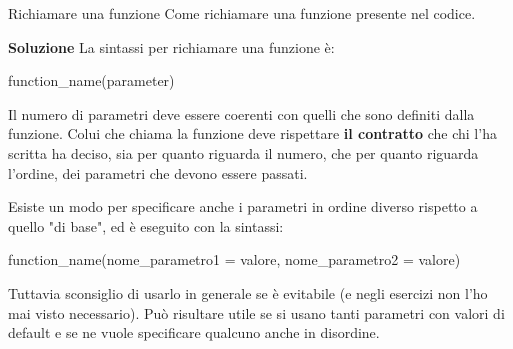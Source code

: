 \documentclass[10pt]{article}
\makeatletter
\newcommand{\<}{\langle}
\renewcommand{\>}{\rangle}
\renewenvironment{proof}[1][\proofname] {\par\pushQED{\qed}
\renewcommand*{\proofname}{Soluzione}
{\normalfont\sffamily\bfseries\topsep6\p@\@plus6\p@\relax #1\@addpunct{.} }}{\popQED\endtrivlist\@endpefalse}
\theoremstyle{mystyle}{\newtheorem*{remark}{Nota}}
\theoremstyle{mystyle}{\newtheorem*{remarks}{Note}}
\theoremstyle{mystyle}{\newtheorem*{example}{Esempio}}
\theoremstyle{mystyle}{\newtheorem*{examples}{Esempi}}
\theoremstyle{definition}{\newtheorem*{exercise}{Exercise}}
\theoremstyle{warn}
\makeatother
\begin{document}
\begin{definition}{Richiamare una funzione}{}
Come richiamare una funzione presente nel codice.
\end{definition}
\begin{proof}
La sintassi per richiamare una funzione è:
\begin{python}
function_name(parameter)
\end{python}
Il numero di parametri deve essere coerenti con quelli che sono definiti dalla funzione. Colui che chiama la funzione deve rispettare \textbf{il contratto} che chi l'ha scritta ha deciso, sia per quanto riguarda il numero, che per quanto riguarda l'ordine, dei parametri che devono essere passati.
\end{proof}
\begin{remark}
Esiste un modo per specificare anche i parametri in ordine diverso rispetto a quello "di base", ed è eseguito con la sintassi:
\begin{python}
function_name(nome_parametro1 = valore, nome_parametro2 = valore)
\end{python}
Tuttavia sconsiglio di usarlo in generale se è evitabile (e negli esercizi     non l'ho mai visto necessario). Può risultare utile se si usano tanti parametri con valori di default e se ne vuole specificare qualcuno anche in disordine.
\end{remark}

\newpage
\end{document}

